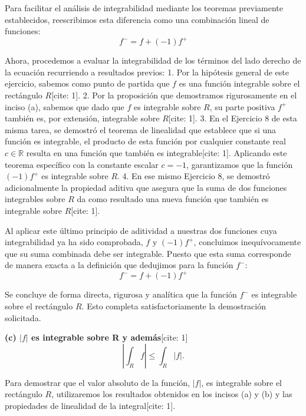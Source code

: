 \documentclass[11pt,letterpaper]{article}
\begin{document}
Para facilitar el análisis de integrabilidad mediante los teoremas previamente establecidos, reescribimos esta diferencia como una combinación lineal de funciones:
\begin{equation*}
f^{-} = f + (-1)f^{+}
\end{equation*}

Ahora, procedemos a evaluar la integrabilidad de los términos del lado derecho de la ecuación recurriendo a resultados previos:
1. Por la hipótesis general de este ejercicio, sabemos como punto de partida que $f$ es una función integrable sobre el rectángulo $R$[cite: 1].
2. Por la proposición que demostramos rigurosamente en el inciso (a), sabemos que dado que $f$ es integrable sobre $R$, su parte positiva $f^{+}$ también es, por extensión, integrable sobre $R$[cite: 1].
3. En el Ejercicio 8 de esta misma tarea, se demostró el teorema de linealidad que establece que si una función es integrable, el producto de esta función por cualquier constante real $c \in \mathbb{R}$ resulta en una función que también es integrable[cite: 1]. Aplicando este teorema específico con la constante escalar $c = -1$, garantizamos que la función $(-1)f^{+}$ es integrable sobre $R$.
4. En ese mismo Ejercicio 8, se demostró adicionalmente la propiedad aditiva que asegura que la suma de dos funciones integrables sobre $R$ da como resultado una nueva función que también es integrable sobre $R$[cite: 1].

Al aplicar este último principio de aditividad a nuestras dos funciones cuya integrabilidad ya ha sido comprobada, $f$ y $(-1)f^{+}$, concluimos inequívocamente que su suma combinada debe ser integrable. Puesto que esta suma corresponde de manera exacta a la definición que dedujimos para la función $f^{-}$:
\begin{equation*}
f^{-} = f + (-1)f^{+}
\end{equation*}

Se concluye de forma directa, rigurosa y analítica que la función $f^{-}$ es integrable sobre el rectángulo $R$. Esto completa satisfactoriamente la demostración solicitada.

\textbf{(c) $|f|$ es integrable sobre R y además}[cite: 1]
\begin{equation*}
\left|\int_{R}f\right|\le\int_{R}|f|.
\end{equation*}

Para demostrar que el valor absoluto de la función, $|f|$, es integrable sobre el rectángulo $R$, utilizaremos los resultados obtenidos en los incisos (a) y (b) y las propiedades de linealidad de la integral[cite: 1]. 
\end{document}
